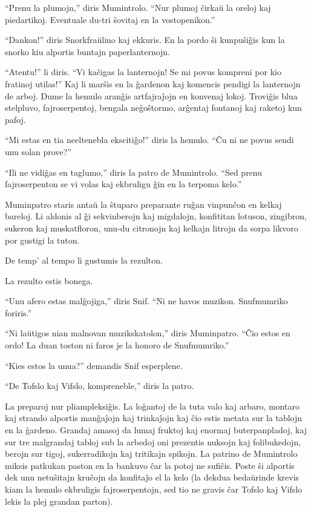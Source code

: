 ``Prenu la plumojn,'' diris Mumintrolo. ``Nur plumoj ĉirkaŭ la oreloj kaj piedartikoj. Eventuale du-tri ŝovitaj en la vostopenikon.''

``Dankon!'' diris Snorkfraŭlino kaj ekkuris. En la pordo ŝi kunpuŝiĝis kun la snorko kiu alportis buntajn paperlanternojn.

``Atentu!'' li diris. ``Vi kaĉigas la lanternojn! Se mi povus kompreni por kio fratinoj utilas!'' Kaj li marŝis en la ĝardenon kaj komencis pendigi la lanternojn de arboj. Dume la hemulo aranĝis artfajraĵojn en konvenaj lokoj. Troviĝis blua stelpluvo, fajroserpentoj, bengala neĝoŝtormo, arĝentaj fontanoj kaj raketoj kun pafoj.

``Mi estas en tia neeltenebla ekscitiĝo!'' diris la hemulo. ``Ĉu ni ne povus sendi unu solan prove?''

``Ili ne vidiĝas en taglumo,'' diris la patro de Mumintrolo. ``Sed prenu fajroserpenton se vi volas kaj ekbruligu ĝin en la terpoma kelo.''

Muminpatro staris antaŭ la ŝtuparo preparante ruĝan vinpunĉon en kelkaj bareloj. Li aldonis al ĝi sekvinberojn kaj migdalojn, konfititan lotuson, zingibron, sukeron kaj muskatfloron, unu-du citronojn kaj kelkajn litrojn da sorpa likvoro por gustigi la tuton.

De temp' al tempo li gustumis la rezulton.

La rezulto estis bonega.

``Unu afero estas malĝojiga,'' diris Snif. ``Ni ne havos muzikon. Snufmumriko foriris.''

``Ni laŭtigos nian malnovan muzikskatolon,'' diris Muminpatro. ``Ĉio estos en ordo! La duan toston ni faros je la honoro de Snufmumriko.''

``Kies estos la unua?'' demandis Snif esperplene.

``De Tofslo kaj Vifslo, kompreneble,'' diris la patro.

La preparoj nur pliampleksiĝis. La loĝantoj de la tuta valo kaj arbaro, montaro kaj strando alportis manĝaĵojn kaj trinkaĵojn kaj ĉio estis metata sur la tablojn en la ĝardeno. Grandaj amasoj da lumaj fruktoj kaj enormaj buterpanpladoj, kaj sur tre malgrandaj tabloj sub la arbedoj oni prezentis nuksojn kaj folibukedojn, berojn sur tigoj, sukerradikojn kaj tritikajn spikojn. La patrino de Mumintrolo miksis patkukan paston en la bankuvo ĉar la potoj ne sufiĉis. Poste ŝi alportis dek unu netuŝitajn kruĉojn da konfitaĵo el la kelo (la dekdua bedaŭrinde krevis kiam la hemulo ekbruligis fajroserpentojn, sed tio ne gravis ĉar Tofslo kaj Vifslo lekis la plej grandan parton).

